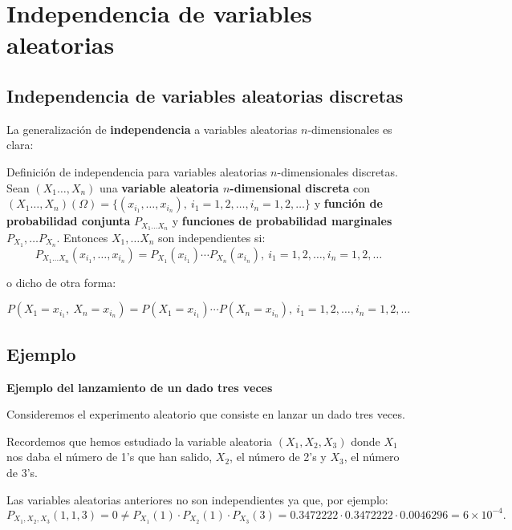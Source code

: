 \documentclass[]{book}
\begin{document}
\hypertarget{independencia-de-variables-aleatorias-1}{%
\section{Independencia de variables aleatorias}\label{independencia-de-variables-aleatorias-1}}

\hypertarget{independencia-de-variables-aleatorias-discretas-2}{%
\subsection{Independencia de variables aleatorias discretas}\label{independencia-de-variables-aleatorias-discretas-2}}

La generalización de \textbf{independencia} a variables aleatorias \(n\)-dimensionales es clara:

Definición de independencia para variables aleatorias \(n\)-dimensionales discretas.
Sean \((X_1\ldots,X_n)\) una \textbf{variable aleatoria \(n\)-dimensional discreta} con \((X_1\ldots,X_n)(\Omega)=\{(x_{i_1},\ldots,x_{i_n}),\ i_1=1,2,\ldots,i_n=1,2,\ldots\}\) y \textbf{función de probabilidad conjunta} \(P_{X_1\ldots X_n}\) y \textbf{funciones de probabilidad marginales} \(P_{X_1},\ldots P_{X_n}\). Entonces \(X_1,\ldots X_n\) son independientes si:
\[
P_{X_1\ldots X_n}(x_{i_1},\ldots,x_{i_n})=P_{X_1}(x_{i_1})\cdots P_{X_n}(x_{i_n}),\ i_1=1,2,\ldots,i_n=1,2,\ldots
\]

o dicho de otra forma:

\[
P(X_1=x_{i_1},\ X_n=x_{i_n})=P(X_1=x_{i_1})\cdots P(X_n=x_{i_n}),\ i_1=1,2,\ldots,i_n=1,2,\ldots
\]

\hypertarget{ejemplo-120}{%
\subsection{Ejemplo}\label{ejemplo-120}}

\textbf{Ejemplo del lanzamiento de un dado tres veces}

Consideremos el experimento aleatorio que consiste en lanzar un dado tres veces.

Recordemos que hemos estudiado la variable aleatoria \((X_1,X_2,X_3)\) donde \(X_1\) nos daba el número de 1's que han salido, \(X_2\), el número de 2's y \(X_3\), el número de 3's.

Las variables aleatorias anteriores no son independientes ya que, por ejemplo:
\[
P_{X_1,X_2,X_3}(1,1,3)=0\neq P_{X_1}(1)\cdot P_{X_2}(1)\cdot P_{X_3}(3)=0.3472222\cdot 0.3472222\cdot 0.0046296=\ensuremath{6\times 10^{-4}}.
\]
\end{document}
